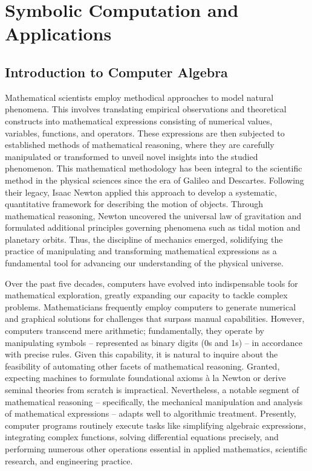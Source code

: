 
\chapter{Symbolic Computation and Applications}
\label{chap2:symbolic_computation}


\section{Introduction to Computer Algebra}
\label{chap2:sec:introduction}

Mathematical scientists employ methodical approaches to model natural phenomena. This involves translating empirical observations and theoretical constructs into mathematical expressions consisting of numerical values, variables, functions, and operators. These expressions are then subjected to established methods of mathematical reasoning, where they are carefully manipulated or transformed to unveil novel insights into the studied phenomenon. This mathematical methodology has been integral to the scientific method in the physical sciences since the era of Galileo and Descartes. Following their legacy, Isaac Newton applied this approach to develop a systematic, quantitative framework for describing the motion of objects. Through mathematical reasoning, Newton uncovered the universal law of gravitation and formulated additional principles governing phenomena such as tidal motion and planetary orbits. Thus, the discipline of mechanics emerged, solidifying the practice of manipulating and transforming mathematical expressions as a fundamental tool for advancing our understanding of the physical universe.

Over the past five decades, computers have evolved into indispensable tools for mathematical exploration, greatly expanding our capacity to tackle complex problems. Mathematicians frequently employ computers to generate numerical and graphical solutions for challenges that surpass manual capabilities. However, computers transcend mere arithmetic; fundamentally, they operate by manipulating symbols -- represented as binary digits (0s and 1s) -- in accordance with precise rules. Given this capability, it is natural to inquire about the feasibility of automating other facets of mathematical reasoning. Granted, expecting machines to formulate foundational axioms {\`a} la Newton or derive seminal theories from scratch is impractical. Nevertheless, a notable segment of mathematical reasoning -- specifically, the mechanical manipulation and analysis of mathematical expressions -- adapts well to algorithmic treatment. Presently, computer programs routinely execute tasks like simplifying algebraic expressions, integrating complex functions, solving differential equations precisely, and performing numerous other operations essential in applied mathematics, scientific research, and engineering practice.

